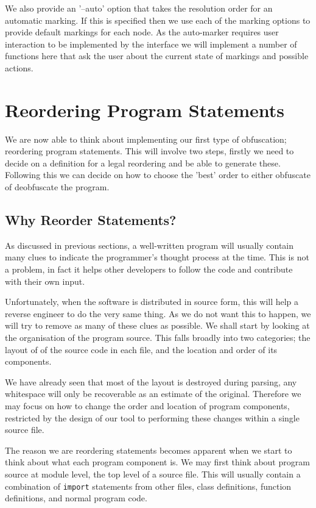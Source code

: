 \documentclass[twoside,a4paper]{report}
\begin{document}
We also provide an '--auto' option that takes the resolution order for an automatic marking. If this is specified then we use each of the
marking options to provide default markings for each node. As the auto-marker requires user interaction to be implemented by the interface
we will implement a number of functions here that ask the user about the current state of markings and possible actions.

\section{Reordering Program Statements}

We are now able to think about implementing our first type of obfuscation; reordering program statements. This will involve two steps,
firstly we need to decide on a definition for a legal reordering and be able to generate these. Following this we can decide on how to
choose the 'best' order to either obfuscate of deobfuscate the program.

\subsection{Why Reorder Statements?}

As discussed in previous sections, a well-written program will usually contain many clues to indicate the programmer's thought process
at the time. This is not a problem, in fact it helps other developers to follow the code and contribute with their own input. 

Unfortunately, when the software is distributed in source form, this will help a reverse engineer to do the very same thing. As we do not want
this to happen, we will try to remove as many of these clues as possible. We shall start by looking at the organisation of the program source.
This falls broadly into two categories; the layout of of the source code in each file, and the location and order of its components. 

We have already seen that most of the layout is destroyed during parsing, any whitespace will only be recoverable as an estimate of the original.
Therefore we may focus on how to change the order and location of program components, restricted by the design of our tool to performing these
changes within a single source file.

The reason we are reordering statements becomes apparent when we start to think about what each program component is. We may first think about
program source at module level, the top level of a source file. This will usually contain a combination of \texttt{import} statements from
other files, class definitions, function definitions, and normal program code.
\end{document}
